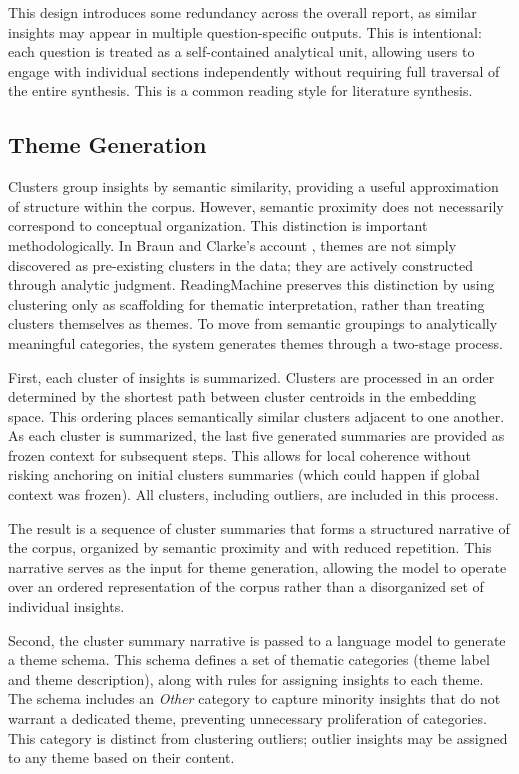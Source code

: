 \documentclass[
  11pt,
]{article}
\begin{document}
This design introduces some redundancy across the overall report, as
similar insights may appear in multiple question-specific outputs. This
is intentional: each question is treated as a self-contained analytical
unit, allowing users to engage with individual sections independently
without requiring full traversal of the entire synthesis. This is a
common reading style for literature synthesis.

\subsection{Theme Generation}\label{theme-generation}

Clusters group insights by semantic similarity, providing a useful
approximation of structure within the corpus. However, semantic
proximity does not necessarily correspond to conceptual organization.
This distinction is important methodologically. In Braun and Clarke's account \cite{braun2006}, themes are not simply discovered as pre-existing
clusters in the data; they are actively constructed through analytic
judgment. ReadingMachine preserves this distinction by using clustering
only as scaffolding for thematic interpretation, rather than treating
clusters themselves as themes. To move from semantic groupings to
analytically meaningful categories, the system generates themes through
a two-stage process.

First, each cluster of insights is summarized. Clusters are processed in
an order determined by the shortest path between cluster centroids in
the embedding space. This ordering places semantically similar clusters
adjacent to one another. As each cluster is summarized, the last five
generated summaries are provided as frozen context for subsequent steps.
This allows for local coherence without risking anchoring on initial
clusters summaries (which could happen if global context was frozen).
All clusters, including outliers, are included in this process.

The result is a sequence of cluster summaries that forms a structured
narrative of the corpus, organized by semantic proximity and with
reduced repetition. This narrative serves as the input for theme
generation, allowing the model to operate over an ordered representation
of the corpus rather than a disorganized set of individual insights.

Second, the cluster summary narrative is passed to a language model to
generate a theme schema. This schema defines a set of thematic
categories (theme label and theme description), along with rules for
assigning insights to each theme. The schema includes an \emph{Other}
category to capture minority insights that do not warrant a dedicated
theme, preventing unnecessary proliferation of categories. This category
is distinct from clustering outliers; outlier insights may be assigned
to any theme based on their content.
\end{document}
